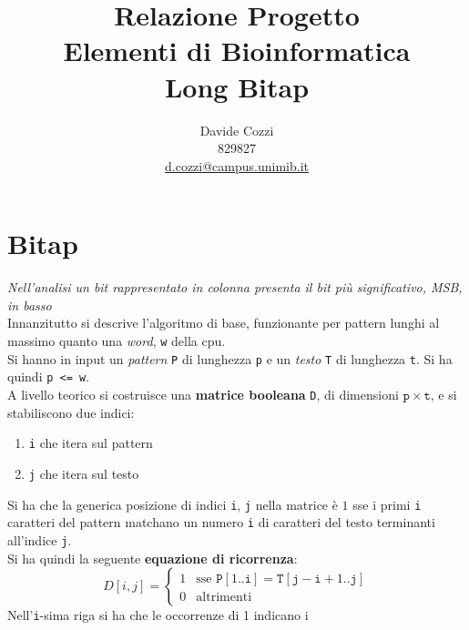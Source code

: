 \documentclass[a4paper,12pt, oneside]{article}
\title{Relazione Progetto\\
  Elementi di Bioinformatica\\
  \large Long Bitap}
\author{Davide Cozzi\\
  829827\\
  \href{mailto:d.cozzi@campus.unimib.it}{d.cozzi@campus.unimib.it}}
\date{}
\begin{document}
\maketitle

\newtheorem{teorema}{Teorema}
\newtheorem{definizione}{Definizione}
\newtheorem{esempio}{Esempio}
\newtheorem{corollario}{Corollario}
\newtheorem{lemma}{Lemma}
\newtheorem{osservazione}{Osservazione}
\newtheorem{nota}{Nota}
\newtheorem{esercizio}{Esercizio}

\renewcommand{\chaptermark}[1]{%
  \markboth{\chaptername
    \ \thechapter.\ #1}{}}
\renewcommand{\sectionmark}[1]{\markright{\thesection.\ #1}}
\allsectionsfont{\centering}

\section*{Bitap}
\textit{Nell'analisi un bit rappresentato in colonna presenta il bit
  più significativo, \textit{MSB}, in basso}\\
Innanzitutto si descrive l'algoritmo di base, funzionante per pattern
lunghi al massimo quanto una \textit{word}, \texttt{w} della cpu.\\
Si hanno in input un \textit{pattern} \texttt{P} di lunghezza \texttt{p} e un
\textit{testo} \texttt{T} di lunghezza \texttt{t}. Si ha quindi \texttt{p <= w}.\\
A livello teorico si costruisce una \textbf{matrice booleana}
\texttt{D}, di dimensioni $\mathtt{p}\times \mathtt{t}$, e si stabiliscono due indici:
\begin{enumerate}
  \item \texttt{i} che itera sul pattern
  \item \texttt{j} che itera sul testo
\end{enumerate}
Si ha che la generica posizione di indici \texttt{i}, \texttt{j} nella
matrice è $1$ sse i primi \texttt{i} caratteri del pattern matchano un
numero \texttt{i} di caratteri del testo terminanti all'indice
\texttt{j}.\\
Si ha quindi la seguente \textbf{equazione di ricorrenza}:
\[D[i,j]=
  \begin{cases}
    1 & \mbox{sse } \mathtt{P}[1..\mathtt{i}] =
    \mathtt{T}[\mathtt{j}-\mathtt{i}+1..\mathtt{j}] \\
    0 & \mbox{altrimenti}
  \end{cases}
\]
Nell'\texttt{i}-sima riga si ha che le occorrenze di 1 indicano i
\end{document}

